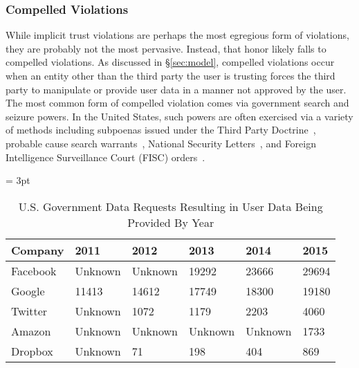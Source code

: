 \subsubsection{Compelled Violations}

While implicit trust violations are perhaps the most egregious form of
violations, they are probably not the most pervasive. Instead, that
honor likely falls to compelled violations. As discussed in
\S\ref{sec:model}, compelled violations occur when an entity other
than the third party the user is trusting forces the third party to
manipulate or provide user data in a manner not approved by the
user. The most common form of compelled violation comes via government
search and seizure powers. In the United States, such powers are often
exercised via a variety of methods including subpoenas issued under
the Third Party Doctrine~\cite{thompson-thirdparty}, probable cause
search warrants~\cite{us-constitution-amend4}, National Security
Letters~\cite{fbi-nsl}, and Foreign Intelligence Surveillance Court
(FISC) orders~\cite{fisc}.

\begin{table}[thb]
  \footnotesize
  \centering
  \tabulinesep = 3pt
  \begin{tabu} to \textwidth
    { | X[2,c,m]
      | X[1,c,m]
      | X[1,c,m]
      | X[1,c,m]
      | X[1,c,m]
      | X[1,c,m]
      | }
    \hline
    \textbf{Company}
    & \textbf{2011}
    & \textbf{2012}
    & \textbf{2013}
    & \textbf{2014}
    & \textbf{2015}
    \\ \hline 
    Facebook
    & Unknown
    & Unknown
    & 19292
    & 23666
    & 29694
    \\ \hline
    Google
    & 11413
    & 14612
    & 17749
    & 18300
    & 19180
    \\ \hline
    Twitter
    & Unknown
    & 1072
    & 1179
    & 2203
    & 4060
    \\ \hline 
    Amazon
    & Unknown
    & Unknown
    & Unknown
    & Unknown
    & 1733
    \\ \hline 
    Dropbox
    & Unknown
    & 71
    & 198
    & 404
    & 869
    \\ \hline 
 \end{tabu}
  \caption{ U.S. Government Data Requests Resulting in User Data Being
    Provided By Year }
  \label{tab:analysis:violations:reports}
\end{table}

